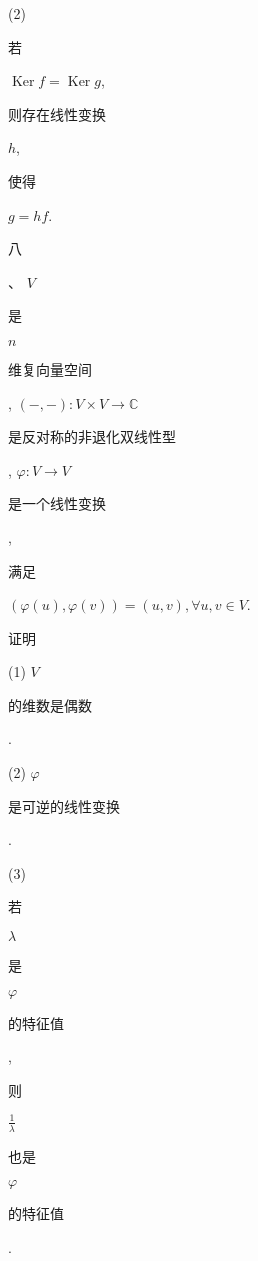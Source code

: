 \documentclass[10pt]{article}
\begin{document}
(2) \begin{CJK}{UTF8}{mj}若\end{CJK} $\operatorname{Ker} f=\operatorname{Ker} g$, \begin{CJK}{UTF8}{mj}则存在线性变换\end{CJK} $h$, \begin{CJK}{UTF8}{mj}使得\end{CJK} $g=h f$.

\begin{CJK}{UTF8}{mj}八\end{CJK}、 $V$ \begin{CJK}{UTF8}{mj}是\end{CJK} $n$ \begin{CJK}{UTF8}{mj}维复向量空间\end{CJK}, $(-,-): V \times V \rightarrow \mathbb{C}$ \begin{CJK}{UTF8}{mj}是反对称的非退化双线性型\end{CJK}, $\varphi: V \rightarrow V$ \begin{CJK}{UTF8}{mj}是一个线性变换\end{CJK}, \begin{CJK}{UTF8}{mj}满足\end{CJK} $(\varphi(u), \varphi(v))=(u, v), \forall u, v \in V$. \begin{CJK}{UTF8}{mj}证明\end{CJK}

(1) $V$ \begin{CJK}{UTF8}{mj}的维数是偶数\end{CJK}.

(2) $\varphi$ \begin{CJK}{UTF8}{mj}是可逆的线性变换\end{CJK}.

(3) \begin{CJK}{UTF8}{mj}若\end{CJK} $\lambda$ \begin{CJK}{UTF8}{mj}是\end{CJK} $\varphi$ \begin{CJK}{UTF8}{mj}的特征值\end{CJK}, \begin{CJK}{UTF8}{mj}则\end{CJK} $\frac{1}{\lambda}$ \begin{CJK}{UTF8}{mj}也是\end{CJK} $\varphi$ \begin{CJK}{UTF8}{mj}的特征值\end{CJK}.
\end{document}
